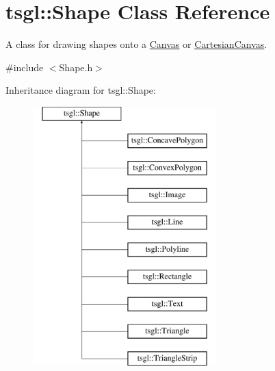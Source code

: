 \hypertarget{classtsgl_1_1_shape}{}\section{tsgl\+:\+:Shape Class Reference}
\label{classtsgl_1_1_shape}


A class for drawing shapes onto a \hyperlink{classtsgl_1_1_canvas}{Canvas} or \hyperlink{classtsgl_1_1_cartesian_canvas}{Cartesian\+Canvas}.  




{\ttfamily \#include $<$Shape.\+h$>$}

Inheritance diagram for tsgl\+:\+:Shape\+:\begin{figure}[H]
\begin{center}
\leavevmode
\includegraphics[height=10.000000cm]{classtsgl_1_1_shape}
\end{center}
\end{figure}

